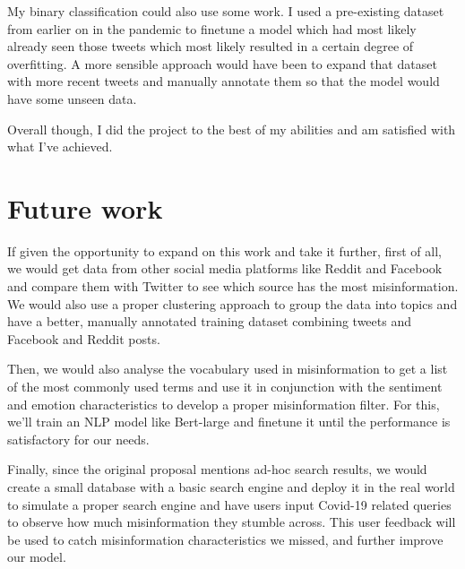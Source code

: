 \documentclass{l4proj}
\begin{document}
My binary classification could also use some work. I used a pre-existing dataset from earlier on in the pandemic to finetune a model which had most likely already seen those tweets which most likely resulted in a certain degree of overfitting. A more sensible approach would have been to expand that dataset with more recent tweets and manually annotate them so that the model would have some unseen data.

Overall though, I did the project to the best of my abilities and am satisfied with what I've achieved.

\section{Future work}
If given the opportunity to expand on this work and take it further, first of all, we would get data from other social media platforms like Reddit and Facebook and compare them with Twitter to see which source has the most misinformation. We would also use a proper clustering approach to group the data into topics and have a better, manually annotated training dataset combining tweets and Facebook and Reddit posts.

Then, we would also analyse the vocabulary used in misinformation to get a list of the most commonly used terms and use it in conjunction with the sentiment and emotion characteristics to develop a proper misinformation filter. For this, we'll train an NLP model like Bert-large and finetune it until the performance is satisfactory for our needs.

Finally, since the original proposal mentions ad-hoc search results, we would create a small database with a basic search engine and deploy it in the real world to simulate a proper search engine and have users input Covid-19 related queries to observe how much misinformation they stumble across. This user feedback will be used to catch misinformation characteristics we missed, and further improve our model.

%
% 
\end{document}
